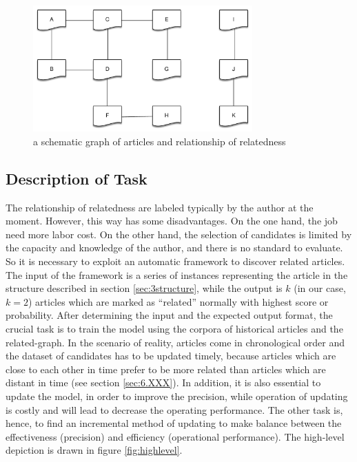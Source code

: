 \begin{figure}[!htb]
    \centering
    \includegraphics[width=0.75\textwidth]{fig/relatedness.pdf}
    \caption{a schematic graph of articles and relationship of relatedness}
    \label{fig:relatedness}
\end{figure}


\subsection{Description of Task}
\label{sec:3.2}

The relationship of relatedness are labeled typically by the author at the moment. However, this way has some disadvantages. On the one hand, the job need more labor cost. On the other hand, the selection of candidates is limited by the capacity and knowledge of the author, and there is no standard to evaluate. So it is necessary to exploit an automatic framework to discover related articles. The input of the framework is a series of instances representing the article in the structure described in section \ref{sec:3structure}, while the output is $k$ (in our case, $k=2$) articles which are marked as ``related'' normally with highest score or probability. After determining the input and the expected output format, the crucial task is to train the model using the corpora of historical articles and the related-graph. In the scenario of reality, articles come in chronological order and the dataset of candidates has to be updated timely, because articles which are close to each other in time prefer to be more related than articles which are distant in time (see section \ref{sec:6.XXX}). In addition, it is also essential to update the model, in order to improve the precision, while operation of updating is costly and will lead to decrease the operating performance. The other task is, hence, to find an incremental method of updating to make balance between the effectiveness (precision) and efficiency (operational performance). The high-level depiction is drawn in figure \ref{fig:highlevel}. 

